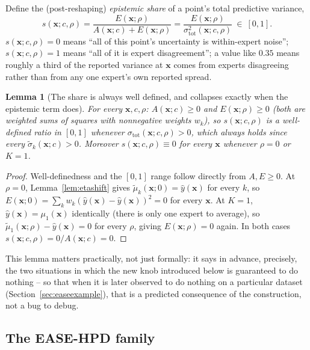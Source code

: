 \documentclass[11pt]{article}
\newtheorem{lemma}{Lemma}[section]
\begin{document}
Define the (post-reshaping) \emph{epistemic share} of a point's total predictive variance,
\begin{equation}
s(\bm x;c,\rho) = \frac{E(\bm x;\rho)}{A(\bm x;c) + E(\bm x;\rho)} =
\frac{E(\bm x;\rho)}{\sigma_{\mathrm{tot}}^2(\bm x;c,\rho)} \ \in\ [0,1].
\label{eq:share}
\end{equation}
$s(\bm x;c,\rho)=0$ means ``all of this point's uncertainty is within-expert noise''; $s(\bm
x;c,\rho)=1$ means ``all of it is expert disagreement''; a value like $0.35$ means roughly a third
of the reported variance at $\bm x$ comes from experts disagreeing rather than from any one
expert's own reported spread.

\begin{lemma}[The share is always well defined, and collapses exactly when the epistemic term
does]
\label{lem:share}
For every $\bm x,c,\rho$: $A(\bm x;c)\ge0$ and $E(\bm x;\rho)\ge0$ (both are weighted sums of
squares with nonnegative weights $w_k$), so $s(\bm x;c,\rho)$ is a well-defined ratio in $[0,1]$
whenever $\sigma_{\mathrm{tot}}(\bm x;c,\rho)>0$, which always holds since every $\tilde\sigma_k(\bm
x;c)>0$. Moreover $s(\bm x;c,\rho)\equiv0$ for every $\bm x$ whenever $\rho=0$ \emph{or} $K=1$.
\end{lemma}
\begin{proof}
Well-definedness and the $[0,1]$ range follow directly from $A,E\ge0$. At $\rho=0$,
Lemma~\ref{lem:etashift} gives $\tilde\mu_k(\bm x;0)=\hat y(\bm x)$ for every $k$, so
$E(\bm x;0) = \sum_k w_k(\hat y(\bm x)-\hat y(\bm x))^2 = 0$ for every $\bm x$. At $K=1$,
$\hat y(\bm x)=\mu_1(\bm x)$ identically (there is only one expert to average), so
$\tilde\mu_1(\bm x;\rho)-\hat y(\bm x)=0$ for every $\rho$, giving $E(\bm x;\rho)=0$ again. In both
cases $s(\bm x;c,\rho) = 0/A(\bm x;c) = 0$.
\end{proof}

This lemma matters practically, not just formally: it says in advance, precisely, the two
situations in which the new knob introduced below is guaranteed to do nothing -- so that when it is
later observed to do nothing on a particular dataset (Section~\ref{sec:easeexample}), that is a
predicted consequence of the construction, not a bug to debug.

\subsection{The EASE-HPD family}
\end{document}
